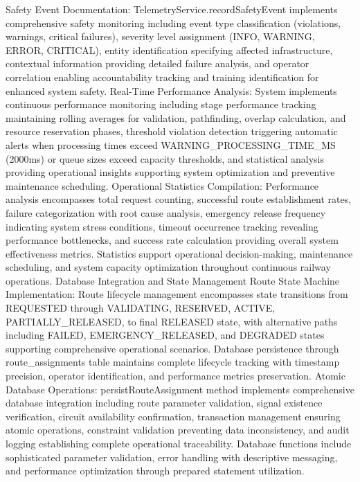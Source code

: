 Safety Event Documentation: TelemetryService.recordSafetyEvent implements comprehensive safety monitoring including event type classification (violations, warnings, critical failures), severity level assignment (INFO, WARNING, ERROR, CRITICAL), entity identification specifying affected infrastructure, contextual information providing detailed failure analysis, and operator correlation enabling accountability tracking and training identification for enhanced system safety.
Real-Time Performance Analysis: System implements continuous performance monitoring including stage performance tracking maintaining rolling averages for validation, pathfinding, overlap calculation, and resource reservation phases, threshold violation detection triggering automatic alerts when processing times exceed WARNING_PROCESSING_TIME_MS (2000ms) or queue sizes exceed capacity thresholds, and statistical analysis providing operational insights supporting system optimization and preventive maintenance scheduling.
Operational Statistics Compilation: Performance analysis encompasses total request counting, successful route establishment rates, failure categorization with root cause analysis, emergency release frequency indicating system stress conditions, timeout occurrence tracking revealing performance bottlenecks, and success rate calculation providing overall system effectiveness metrics. Statistics support operational decision-making, maintenance scheduling, and system capacity optimization throughout continuous railway operations.
Database Integration and State Management
Route State Machine Implementation: Route lifecycle management encompasses state transitions from REQUESTED through VALIDATING, RESERVED, ACTIVE, PARTIALLY_RELEASED, to final RELEASED state, with alternative paths including FAILED, EMERGENCY_RELEASED, and DEGRADED states supporting comprehensive operational scenarios. Database persistence through route_assignments table maintains complete lifecycle tracking with timestamp precision, operator identification, and performance metrics preservation.
Atomic Database Operations: persistRouteAssignment method implements comprehensive database integration including route parameter validation, signal existence verification, circuit availability confirmation, transaction management ensuring atomic operations, constraint validation preventing data inconsistency, and audit logging establishing complete operational traceability. Database functions include sophisticated parameter validation, error handling with descriptive messaging, and performance optimization through prepared statement utilization.
